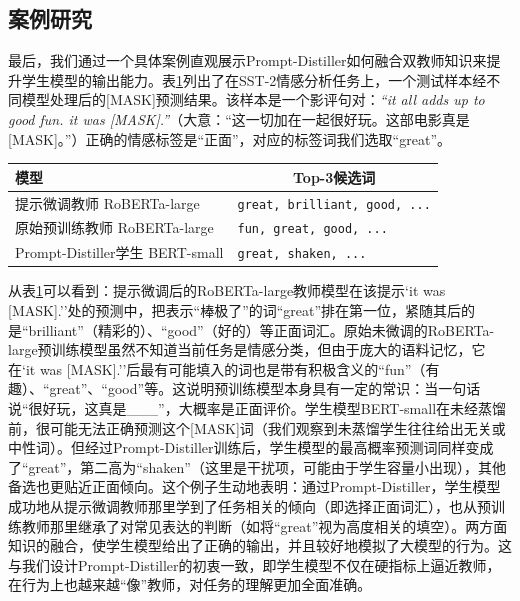 \documentclass[../main.tex]{subfiles}
\begin{document}
\subsection{案例研究}
\label{sec:3-5-5}
最后，我们通过一个具体案例直观展示Prompt-Distiller如何融合双教师知识来提升学生模型的输出能力。表\ref{tab:case-study}列出了在SST-2情感分析任务上，一个测试样本经不同模型处理后的[MASK]预测结果。该样本是一个影评句对：\textit{“it all adds up to good fun. it was [MASK].”}（大意：“这一切加在一起很好玩。这部电影真是[MASK]。”）正确的情感标签是“正面”，对应的标签词我们选取“great”。

\begin{table}[htbp]
	\centering
	\label{tab:case-study}
	\small\begin{tabular}{l|p{6cm}}
		\toprule[1pt]
		\textbf{模型}                   & \multicolumn{1}{c}{\textbf{Top-3候选词}}       \\
		\midrule[0.5pt]
		提示微调教师 RoBERTa-large          & \texttt{\small great, brilliant, good, ...} \\
		原始预训练教师 RoBERTa-large         & \texttt{\small fun, great, good, ...}       \\
		Prompt-Distiller学生 BERT-small & \texttt{\small great, shaken, ...}          \\
		\bottomrule[1pt]
	\end{tabular}
\end{table}

从表\ref{tab:case-study}可以看到：提示微调后的RoBERTa-large教师模型在该提示`it was [MASK].''处的预测中，把表示“棒极了”的词“great”排在第一位，紧随其后的是“brilliant”（精彩的）、“good”（好的）等正面词汇。原始未微调的RoBERTa-large预训练模型虽然不知道当前任务是情感分类，但由于庞大的语料记忆，它在`it was [MASK].''后最有可能填入的词也是带有积极含义的“fun”（有趣）、“great”、“good”等。这说明预训练模型本身具有一定的常识：当一句话说“很好玩，这真是\_\_\_”，大概率是正面评价。学生模型BERT-small在未经蒸馏前，很可能无法正确预测这个[MASK]词（我们观察到未蒸馏学生往往给出无关或中性词）。但经过Prompt-Distiller训练后，学生模型的最高概率预测词同样变成了“great”，第二高为“shaken”（这里是干扰项，可能由于学生容量小出现），其他备选也更贴近正面倾向。这个例子生动地表明：通过Prompt-Distiller，学生模型成功地从提示微调教师那里学到了任务相关的倾向（即选择正面词汇），也从预训练教师那里继承了对常见表达的判断（如将“great”视为高度相关的填空）。两方面知识的融合，使学生模型给出了正确的输出，并且较好地模拟了大模型的行为。这与我们设计Prompt-Distiller的初衷一致，即学生模型不仅在硬指标上逼近教师，在行为上也越来越“像”教师，对任务的理解更加全面准确。
\end{document}
